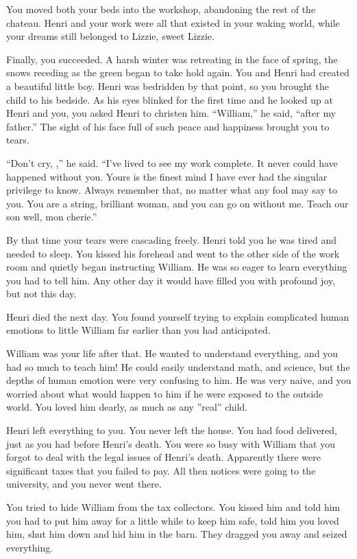 \documentclass[char]{airship}
\begin{document}
You moved both your beds into the workshop, abandoning the rest of the
chateau. Henri and your work were all that existed in your waking
world, while your dreams still belonged to Lizzie, sweet Lizzie.

Finally, you succeeded. A harsh winter was retreating in the face of
spring, the snows receding as the green began to take hold again. You
and Henri had created a beautiful little boy. Henri was bedridden by
that point, so you brought the child to his bedside. As his eyes
blinked for the first time and he looked up at Henri and you, you
asked Henri to christen him. ``William,'' he said, ``after my
father.'' The sight of his face full of such peace and happiness
brought you to tears.

``Don't cry, \me{\first},'' he said. ``I've lived to see my work
complete. It never could have happened without you. Yours is the
finest mind I have ever had the singular privilege to know. Always
remember that, no matter what any fool may say to you. You are a
string, brilliant woman, and you can go on without me. Teach our son
well, mon cherie.''

By that time your tears were cascading freely. Henri told you he was
tired and needed to sleep. You kissed his forehead and went to the
other side of the work room and quietly began instructing William. He
was so eager to learn everything you had to tell him. Any other day it
would have filled you with profound joy, but not this day.

Henri died the next day. You found yourself trying to explain
complicated human emotions to little William far earlier than you had
anticipated.

William was your life after that. He wanted to understand everything,
and you had so much to teach him! He could easily understand math, and
science, but the depths of human emotion were very confusing to
him. He was very naive, and you worried about what would happen to him
if he were exposed to the outside world. You loved him dearly, as much
as any ''real'' child.

Henri left everything to you. You never left the house. You had food
delivered, just as you had before Henri's death. You were so busy with
William that you forgot to deal with the legal issues of Henri's
death. Apparently there were significant taxes that you failed to
pay. All then notices were going to the university, and you never went
there.

You tried to hide William from the tax collectors. You kissed him and
told him you had to put him away for a little while to keep him safe,
told him you loved him, shut him down and hid him in the barn. They
dragged you away and seized everything. 
\end{document}
